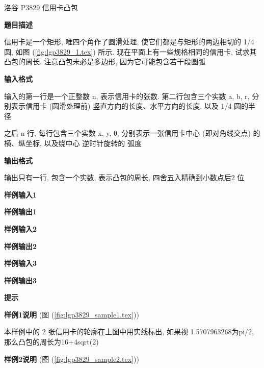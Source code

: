 \begin{frame}{洛谷 P3829 信用卡凸包}
	\label{cvh:example:lgp3829}

	\textbf{题目描述}

	信用卡是一个矩形, 唯四个角作了圆滑处理, 使它们都是与矩形的两边相切的 1/4 圆, 如图 (\ref{fig:lgp3829_1.tex}) 所示. 现在平面上有一些规格相同的信用卡, 试求其凸包的周长. 注意凸包未必是多边形, 因为它可能包含若干段圆弧


	\textbf{输入格式}

	输入的第一行是一个正整数 n, 表示信用卡的张数. 第二行包含三个实数 a, b, r, 分别表示信用卡 (圆滑处理前) 竖直方向的长度、水平方向的长度, 以及 1/4 圆的半径

	之后 n 行, 每行包含三个实数 x, y, θ, 分别表示一张信用卡中心 (即对角线交点) 的横、纵坐标, 以及绕中心 逆时针旋转的 弧度

	\textbf{输出格式}

	输出只有一行, 包含一个实数, 表示凸包的周长, 四舍五入精确到小数点后2 位

	\textbf{样例输入1}


	\textbf{样例输出1}


	\textbf{样例输入2}


	\textbf{样例输出2}


	\textbf{样例输入3}


	\textbf{样例输出3}


	\newpage

	\textbf{提示}

	\textbf{样例1说明} (图 (\ref{fig:lgp3829_sample1.tex}))


	本样例中的 2 张信用卡的轮廓在上图中用实线标出, 如果视 1.5707963268为pi/2, 那么凸包的周长为16+4sqrt(2)

	\newpage

	\textbf{样例2说明} (图 (\ref{fig:lgp3829_sample2.tex}))



\end{frame}
